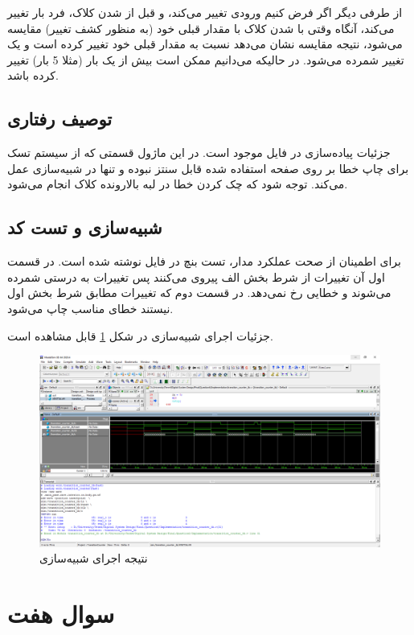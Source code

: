 \documentclass[fleqn]{article}
\begin{document}
از طرفی دیگر اگر فرض کنیم ورودی
تغییر می‌کند، و قبل از
شدن کلاک، فرد بار تغییر می‌کند، آنگاه وقتی با
شدن کلاک با مقدار قبلی خود (به منظور کشف تغییر) مقایسه می‌شود، نتیجه مقایسه نشان می‌دهد نسبت به مقدار قبلی خود
تغییر کرده است و یک تغییر شمرده می‌شود. در حالیکه می‌دانیم ممکن است بیش از یک بار (مثلا 5 بار) تغییر کرده باشد.

\subsection{توصیف رفتاری}
جزئیات پیاده‌سازی در فایل
موجود است. در این ماژول قسمتی که از سیستم تسک برای چاپ خطا بر روی صفحه استفاده شده قابل سنتز نبوده و
تنها در شبیه‌سازی عمل می‌کند. توجه شود که چک کردن خطا در لبه بالارونده کلاک انجام می‌شود.

\subsection{شبیه‌سازی و تست کد}
برای اطمینان از صحت عملکرد مدار، تست بنچ در فایل
نوشته شده است. در قسمت اول آن تغییرات از شرط بخش الف پیروی می‌کنند پس تغییرات به درستی شمرده می‌شوند و
خطایی رخ نمی‌دهد. در قسمت دوم که تغییرات مطابق شرط بخش اول نیستند خطای مناسب چاپ می‌شود.

جزئیات اجرای شبیه‌سازی در شکل
\ref{simulate6}
قابل مشاهده است.

\begin{figure}[!htbp]
	\centering
	\includegraphics[width=\linewidth]{6.png}
	\caption{نتیجه اجرای شبیه‌سازی }
	\label{simulate6}
\end{figure}

\section{سوال هفت}
\end{document}
